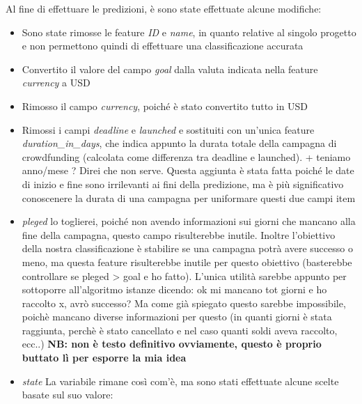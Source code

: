 \documentclass{article}
\begin{document}
    Al fine di effettuare le predizioni, è sono state effettuate alcune modifiche:
    \begin{itemize}
        
        \item Sono state rimosse le feature \textit{ID} e \textit{name}, in quanto relative al singolo progetto e non permettono quindi di effettuare una classificazione accurata
        
        \item Convertito il valore del campo \textit{goal} dalla valuta indicata nella feature \textit{currency} a USD 
        
        \item Rimosso il campo \textit{currency}, poiché è stato convertito tutto in USD
        
        \item Rimossi i campi \textit{deadline} e \textit{launched} e sostituiti con un'unica feature \textit{duration\_in\_days}, che indica appunto la durata totale della campagna di crowdfunding (calcolata come differenza tra deadline e launched). + teniamo anno/mese ? Direi che non serve. Questa aggiunta è stata fatta poiché le date di inizio e fine sono irrilevanti ai fini della predizione, ma è più significativo conoscenere la durata di una campagna per uniformare questi due campi
        item
        
        \item \textit{pleged} lo toglierei, poiché non avendo informazioni sui giorni che mancano alla fine della campagna, questo campo risulterebbe inutile. Inoltre l'obiettivo della nostra classificazione è stabilire se una campagna potrà avere successo o meno, ma questa feature risulterebbe inutile per questo obiettivo (basterebbe controllare se pleged > goal e ho fatto). L'unica utilità sarebbe appunto per sottoporre all'algoritmo istanze dicendo: ok mi mancano tot giorni e ho raccolto x, avrò successo? Ma come già spiegato questo sarebbe impossibile, poichè mancano diverse informazioni per questo (in quanti giorni è stata raggiunta, perchè è stato cancellato e nel caso quanti soldi aveva raccolto, ecc..) \textbf{NB: non è testo definitivo ovviamente, questo è proprio buttato lì per esporre la mia idea}
        
        \item \textit{state} La variabile rimane così com'è, ma sono stati effettuate alcune scelte basate sul suo valore:
            \begin{itemize}
            

\end{itemize}
\end{itemize}
\end{document}

